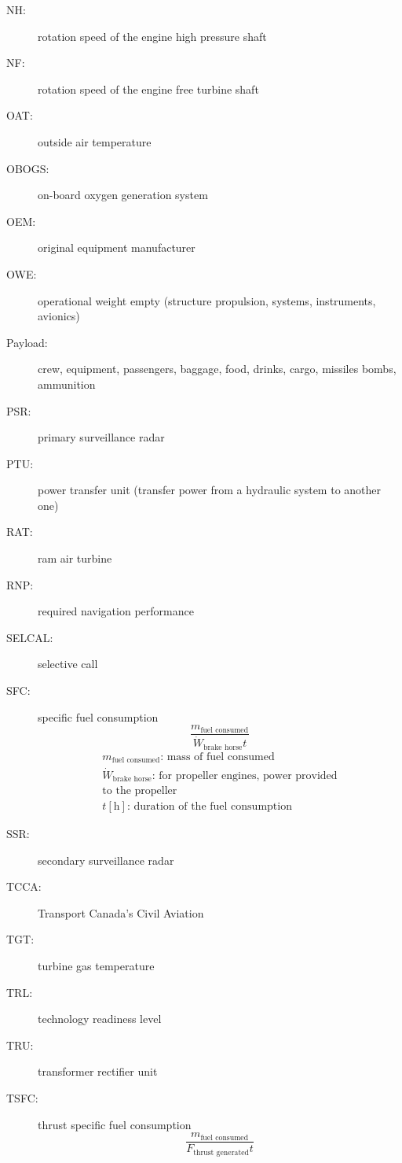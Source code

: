 \documentclass[10pt, twocolumn]{article}
\begin{document}
\begin{description}
  \item[NH:] rotation speed of the engine high pressure shaft
  \item[NF:] rotation speed of the engine free turbine shaft
  \item[OAT:] outside air temperature
  \item[OBOGS:] on-board oxygen generation system
  \item[OEM:] original equipment manufacturer
  \item[OWE:] operational weight empty (structure propulsion, systems, instruments, avionics)
  \item[Payload:] crew, equipment, passengers, baggage, food, drinks, cargo, missiles bombs, ammunition
  \item[PSR:] primary surveillance radar
  \item[PTU:] power transfer unit (transfer power from a hydraulic system to another one)
  \item[RAT:] ram air turbine
  \item[RNP:] required navigation performance
  \item[SELCAL:] selective call
  \item[SFC:] specific fuel consumption
        \[
          \frac{m_\text{fuel consumed}}{\dot{W}_\text{brake horse}t}
        \]
        \[
          \begin{array}{|l}
            m_\text{fuel consumed} \text{: mass of fuel consumed}                     \\
            \dot{W}_\text{brake horse} \text{: for propeller engines, power provided} \\
            \text{to the propeller}                                                   \\
            t [\si{\hour}] \text{: duration of the fuel consumption}
          \end{array}
        \]
  \item[SSR:] secondary surveillance radar
  \item[TCCA:] Transport Canada's Civil Aviation
  \item[TGT:] turbine gas temperature
  \item[TRL:] technology readiness level
  \item[TRU:] transformer rectifier unit
  \item[TSFC:] thrust specific fuel consumption
        \[
          \frac{m_\text{fuel consumed}}{F_\text{thrust generated}t}
        \]
        \[
          \begin{array}{|l}

\end{array}\]
\end{description}
\end{document}
